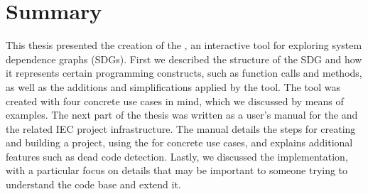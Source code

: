 \chapter{Summary} \label{ch:summary}

This thesis presented the creation of the \SB, an interactive tool for exploring system dependence graphs (SDGs). First 
we described the structure of the SDG and how it represents certain programming constructs, such as function calls and 
methods, as well as the additions and simplifications applied by the tool. The tool was created with four concrete use 
cases in mind, which we discussed by means of examples. The next part of the thesis was written as a user's manual for 
the \SB and the related IEC project infrastructure. The manual details the steps for creating and building a project, 
using the \SB for concrete use cases, and explains additional features such as dead code detection. Lastly, we 
discussed the implementation, with a particular focus on details that may be important to someone trying to understand 
the \SB code base and extend it.

